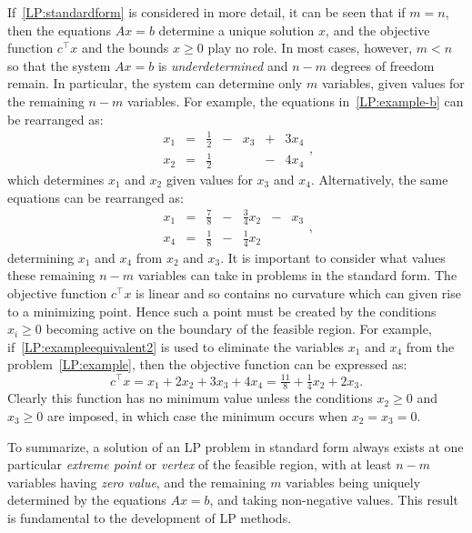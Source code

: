 If~\eqref{LP:standardform} is considered in more detail, it can be seen that if $m=n$, then the equations $Ax=b$ determine a unique solution $x$, and the objective function $c^\top x$ and the bounds $x\ge0$ play no role. In most cases, however, $m<n$ so that the system $Ax=b$ is {\em underdetermined} and $n-m$ degrees of freedom remain. In particular, the system can determine only $m$ variables, given values for the remaining $n-m$ variables. For example, the equations in~\eqref{LP:example-b} can be rearranged as:
\begin{equation}\label{LP:exampleequivalent1}
\begin{array}{rrrrrrr} x_1 & = & \tfrac{1}{2} & - & x_3 & + & 3x_4\\ x_2 & = & \tfrac{1}{2} & & & - & 4x_4\end{array},
\end{equation}
which determines $x_1$ and $x_2$ given values for $x_3$ and $x_4$. Alternatively, the same equations can be rearranged as:
\begin{equation}\label{LP:exampleequivalent2}
\begin{array}{rrrrrrr} x_1 & = & \tfrac{7}{8} & - & \tfrac{3}{4}x_2 & - & x_3\\ x_4 & = & \tfrac{1}{8} & - & \tfrac{1}{4}x_2 &  &\end{array},
\end{equation}
determining $x_1$ and $x_4$ from $x_2$ and $x_3$. It is important to consider what values these remaining $n-m$ variables can take in problems in the standard form. The objective function $c^\top x$ is linear and so contains no curvature which can given rise to a minimizing point. Hence such a point must be created by the conditions $x_i\ge0$ becoming active on the boundary of the feasible region. For example, if~\eqref{LP:exampleequivalent2} is used to eliminate the variables $x_1$ and $x_4$ from the problem~\eqref{LP:example}, then the objective function can be expressed as:
\begin{equation}
c^\top x = x_1 +2x_2 + 3x_3 + 4x_4 = \tfrac{11}{8} + \tfrac{1}{4}x_2 + 2x_3.
\end{equation}
Clearly this function has no minimum value unless the conditions $x_2\ge0$ and $x_3\ge0$ are imposed, in which case the minimum occurs when $x_2=x_3=0$.

To summarize, a solution of an LP problem in standard form always exists at one particular {\em extreme point} or {\em vertex} of the feasible region, with at least $n-m$ variables having {\em zero value}, and the remaining $m$ variables being uniquely determined by the equations $Ax = b$, and taking non-negative values. This result is fundamental to the development of LP methods.

